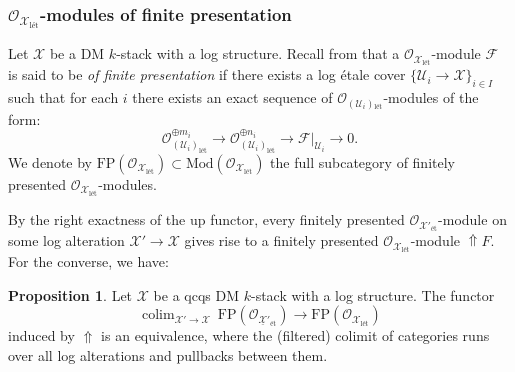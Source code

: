 \documentclass[11pt]{amsart}
\newcommand{\PKHcomment}[1]{{\color{red}PKH: #1}}
\theoremstyle{definition}
\theoremstyle{definition}
\newtheorem{proposition}[theorem]{Proposition}
\newcommand{\cO}{\mathcal{O}}
\newcommand{\cU}{\mathcal{U}}
\newcommand{\cX}{\mathcal{X}}
\newcommand{\LogO}[1]{\mathcal{O}_{{#1}_\text{l\'et}}}
\newcommand{\ul}[1]{\underline{#1}}
\newcommand{\cal}{\mathcal}
\def\cO{{\cal O}}
\def\cU{{\cal U}}
\def\cX{{\cal X}}
\begin{document}
\subsubsection{$\mathcal{O}_{\mathcal{X}_{\text{l\'et}}}$-modules of finite presentation} 

Let $\mathcal{X}$ be a DM $k$-stack with a log structure. Recall from \cite[03DL]{stacks} that a $\mathcal{O}_{\mathcal{X}_{\text{l\'et}}}$-module $\mathcal{F}$ is said to be \emph{of finite presentation} if there exists a log \'etale cover 
$\{\cU_i\rightarrow \mathcal{X}\}_{i\in I}$
such that for each $i$ there exists an exact sequence of $\mathcal{O}_{(\mathcal{U}_i){}_{\text{l\'et}}}$-modules
of the form:  $$\mathcal{O}_{(\cU_i)_{\text{l\'et}}}^{\oplus m_i}\longrightarrow\mathcal{O}_{(\cU_i)_{\text{l\'et}}}^{\oplus n_i}\longrightarrow \mathcal{F}|_{\cU_i}\longrightarrow 0.$$
We denote by $\text{FP}(\LogO{\cX})\subset \text{Mod}(\mathcal{O}_{\mathcal{X}_{\text{l\'et}}})$ the full subcategory of finitely presented $\mathcal{O}_{\mathcal{X}_{\text{l\'et}}}$-modules.

By the right exactness of the up functor, every finitely presented $\mathcal{O}_{\mathcal{X}'_{\text{\'et}}}$-module on some log alteration $\mathcal{X}'\rightarrow \mathcal{X}$ gives rise to a finitely presented $\mathcal{O}_{\mathcal{X}_{\text{l\'et}}}$-module $\Uparrow \!\! F$. For the converse, we have:
\begin{proposition}\label{proposition on finite presentation}
Let $\mathcal{X}$ be a qcqs DM $k$-stack with a log structure. The functor
\[
    \mathop{\text{colim}}_{\mathcal{X}'\rightarrow \mathcal{X}}  \ \text{FP}(\cO_{\ul{\mathcal{X}}{}'_{\text{\'et}}})\longrightarrow \text{FP}(\LogO{\cX})
\]
induced by $\Uparrow$ is an equivalence,
where the (filtered) colimit of categories runs over all log alterations and pullbacks between them. 
\end{proposition}
\end{document}

